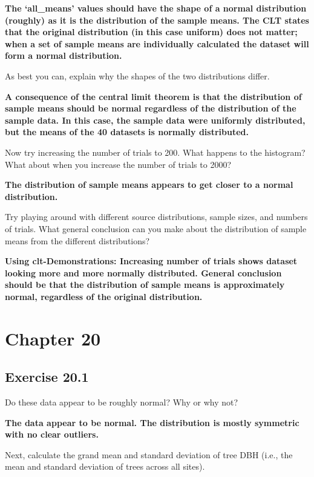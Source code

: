 \documentclass[
]{scrbook}
\begin{document}
\textbf{The `all\_means' values should have the shape of a normal distribution (roughly) as it is the distribution of the sample means. The CLT states that the original distribution (in this case uniform) does not matter; when a set of sample means are individually calculated the dataset will form a normal distribution.}

As best you can, explain why the shapes of the two distributions differ.

\textbf{A consequence of the central limit theorem is that the distribution of sample means should be normal regardless of the distribution of the sample data. In this case, the sample data were uniformly distributed, but the means of the 40 datasets is normally distributed.}

Now try increasing the number of trials to 200. What happens to the histogram? What about when you increase the number of trials to 2000?

\textbf{The distribution of sample means appears to get closer to a normal distribution.}

Try playing around with different source distributions, sample sizes, and numbers of trials. What general conclusion can you make about the distribution of sample means from the different distributions?

\textbf{Using clt-Demonstrations: Increasing number of trials shows dataset looking more and more normally distributed. General conclusion should be that the distribution of sample means is approximately normal, regardless of the original distribution.}

\hypertarget{chapter-20}{%
\section{Chapter 20}\label{chapter-20}}

\hypertarget{exercise-20.1}{%
\subsection{Exercise 20.1}\label{exercise-20.1}}

Do these data appear to be roughly normal? Why or why not?

\textbf{The data appear to be normal. The distribution is mostly symmetric with no clear outliers.}

Next, calculate the grand mean and standard deviation of tree DBH (i.e., the mean and standard deviation of trees across all sites).
\end{document}
